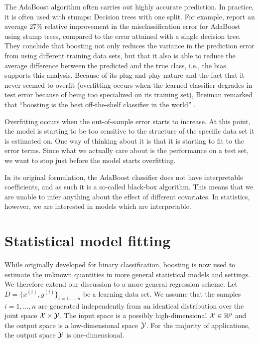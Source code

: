 The AdaBoost algorithm often carries out highly accurate prediction. In practice, it is often used with stumps: Decision trees with one split. For example, \citet{bauer-kohavi} report an average 27\% relative improvement in the misclassification error for AdaBoost using stump trees, compared to the error attained with a single decision tree. They conclude that boosting not only reduces the variance in the prediction error from using different training data sets, but that it also is able to reduce the average difference between the predicted and the true class, i.e., the bias. \citet{breiman1998} supports this analysis. Because of its plug-and-play nature and the fact that it never seemed to overfit (overfitting occurs when the learned classifier degrades in test error because of being too specialized on its training set), Breiman remarked that ``boosting is the best off-the-shelf classifier in the world'' \citep{ESL}.

Overfitting occurs when the out-of-sample error starts to increase. At this point, the model is starting to be too sensitive to the structure of the specific data set it is estimated on. One way of thinking about it is that it is starting to fit to the error terms. Since what we actually care about is the performance on a test set, we want to stop just before the model starts overfitting.

In its original formulation, the AdaBoost classifier does not have interpretable coefficients, and as such it is a so-called black-box algorithm. This means that we are unable to infer anything about the effect of different covariates. In statistics, however, we are interested in models which are interpretable.


\section{Statistical model fitting}
While originally developed for binary classification, boosting is now used to estimate the unknown quantities in more general statistical models and settings. We therefore extend our discussion to a more general regression scheme. Let $D=\{x^{(i)},y^{(i)}\}_{i=1,\ldots,n}$ be a learning data set. We assume that the samples $i=1,\ldots,n$ are generated independently from an identical distribution over the joint space $\mathcal{X}\times\mathcal{Y}$. The input space is a possibly high-dimensional $\mathcal{X}\in\mathbb{R}^p$ and the output space is a low-dimensional space $\mathcal{Y}$. For the majority of applications, the output space $\mathcal{Y}$ is one-dimensional.

